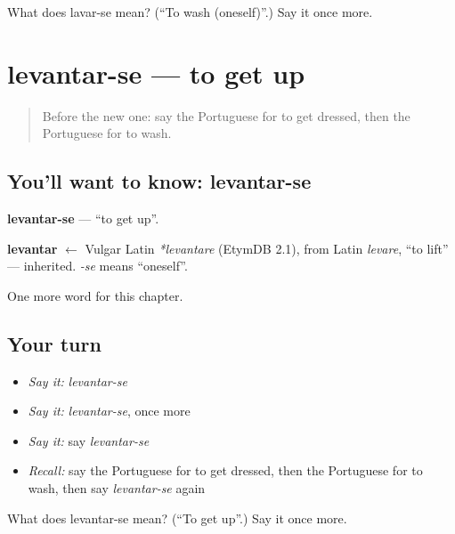 \begin{tcolorbox}[breakable,colback=teal!4,colframe=teal!35!black,title={Before you move on}]
What does lavar-se mean? (\textquotedblleft{}To wash (oneself)\textquotedblright{}.) Say it once more.
\end{tcolorbox}
\section[levantar-se]{levantar-se — to get up}

\label{lesson:PT-C132-levantar-se}



\begin{quote}
Before the new one: say the Portuguese for to get dressed, then the Portuguese for to wash.
\end{quote}

\subsection*{You'll want to know: levantar-se}
\textbf{levantar-se} — \textquotedblleft{}to get up\textquotedblright{}.

\begin{cousinweb}
\textbf{levantar} $\leftarrow$ Vulgar Latin \emph{*levantare} (EtymDB 2.1), from Latin \emph{levare}, \textquotedblleft{}to lift\textquotedblright{} — inherited. \emph{-se} means \textquotedblleft{}oneself\textquotedblright{}.
\end{cousinweb}

\begin{grammarlens}[title={What you've built}]
One more word for this chapter.
\end{grammarlens}

\subsection*{Your turn}
\begin{itemize}
\raggedright
  \item \emph{Say it:} \emph{levantar-se}
  \item \emph{Say it:} \emph{levantar-se}, once more
  \item \emph{Say it:} say \emph{levantar-se}
  \item \emph{Recall:} say the Portuguese for to get dressed, then the Portuguese for to wash, then say \emph{levantar-se} again
\end{itemize}

\begin{tcolorbox}[breakable,colback=teal!4,colframe=teal!35!black,title={Before you move on}]
What does levantar-se mean? (\textquotedblleft{}To get up\textquotedblright{}.) Say it once more.
\end{tcolorbox}

